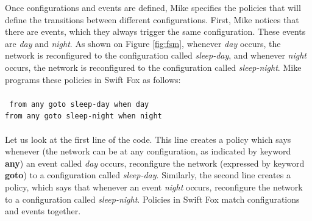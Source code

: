 Once configurations and events are defined, Mike specifies the policies
that will define the transitions between different configurations. First,
Mike notices that there are events, which they always trigger the same
configuration. These events are \textit{day} and \textit{night}. As shown
on Figure \ref{fig:fsm}, whenever \textit{day} occurs, the network is
reconfigured to the configuration called \textit{sleep-day}, and whenever
\textit{night} occurs, the network is reconfigured to the configuration
called \textit{sleep-night}. Mike programs these policies in Swift Fox as
follows:								\\
\\
\texttt{
from any goto sleep-day when day					\\
from any goto sleep-night when night					\\
}\\
Let us look at the first line of the code. This line creates a policy which
says whenever (the network can be at any configuration, as indicated by
keyword \textbf{any}) an event called \textit{day} occurs, reconfigure the 
network (expressed by keyword \textbf{goto}) to a configuration called
\textit{sleep-day}. Similarly, the second line creates a policy, which says
that whenever an event \textit{night} occurs, reconfigure the network to a 
configuration called \textit{sleep-night}. Policies in Swift Fox match
configurations and events together. 

